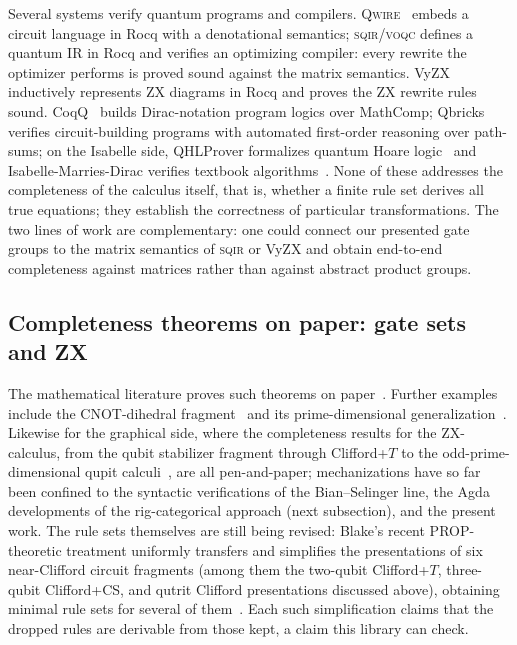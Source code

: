 Several systems verify quantum programs and compilers.
\textsc{Qwire}~\cite{paykin2017qwire,rand2018qwirepractice} embeds a circuit language in Rocq
with a denotational semantics; \textsc{sqir}/\textsc{voqc}
\cite{hietala2021voqc,hietala2021proving} defines a quantum IR in Rocq and
verifies an optimizing compiler: every rewrite the optimizer performs
is proved sound against the matrix semantics.
VyZX~\cite{lehmann2025vyzx} inductively represents ZX diagrams in Rocq and
proves the ZX rewrite rules sound.  CoqQ~\cite{zhou2023coqq} builds
Dirac-notation program logics over MathComp;
Qbricks~\cite{chareton2021qbricks} verifies circuit-building programs
with automated first-order reasoning over path-sums; on the Isabelle
side, QHLProver formalizes quantum Hoare logic~\cite{liu2019quantum} and
Isabelle-Marries-Dirac verifies textbook algorithms~\cite{bordg2020dirac}.
None of these addresses the completeness of the calculus itself, that is,
whether a finite rule set derives all true equations; they establish the
correctness of particular transformations.  The two lines of work are
complementary: one could connect our presented
gate groups to the matrix semantics of \textsc{sqir} or VyZX and obtain
end-to-end completeness against matrices rather than against abstract
product groups.

\subsection{Completeness theorems on paper: gate sets and ZX}\label{sec:rel-paper}

The mathematical literature proves such theorems on
paper~\cite{selinger2015clifford,clement2023complete,clement2024minimal,
li2025qutrit,clement2026realcliffordch}.  Further examples include the
CNOT-dihedral fragment~\cite{amy2018cnotdihedral} and its
prime-dimensional generalization~\cite{blake2026phaseaffine}.  Likewise for the graphical
side, where the completeness results for the ZX-calculus, from the qubit
stabilizer fragment through Clifford+$T$ to the odd-prime-dimensional
qupit calculi~\cite{backens2014zx,jeandel2018zx,booth2022qupitzx,
poor2023travaganza}, are all pen-and-paper; mechanizations have so far
been confined to the syntactic verifications of the Bian--Selinger line,
the Agda developments of the
rig-categorical approach (next subsection), and the present work.  The rule sets themselves are
still being revised: Blake's recent PROP-theoretic treatment uniformly
transfers and simplifies the presentations of six near-Clifford circuit
fragments (among them the two-qubit Clifford+$T$, three-qubit
Clifford+CS, and qutrit Clifford presentations discussed above),
obtaining minimal rule sets for several of
them~\cite{blake2026simpler}.  Each such simplification claims that the
dropped rules are derivable from those kept, a claim this library can
check.

